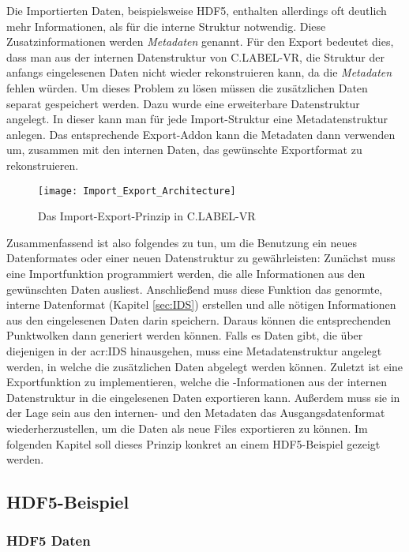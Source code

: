 Die Importierten Daten, beispielsweise HDF5, enthalten allerdings oft deutlich mehr Informationen, als für die interne Struktur notwendig. Diese Zusatzinformationen werden \textit{Metadaten} genannt. Für den Export bedeutet dies, dass man aus der internen Datenstruktur von C.LABEL-VR, die Struktur der anfangs eingelesenen Daten nicht wieder rekonstruieren kann, da die \textit{Metadaten} fehlen würden. Um dieses Problem zu lösen müssen die zusätzlichen Daten separat gespeichert werden. Dazu wurde eine erweiterbare Datenstruktur angelegt. In dieser kann man für jede Import-Struktur eine Metadatenstruktur anlegen. Das entsprechende Export-Addon kann die Metadaten dann verwenden um, zusammen mit den internen Daten, das gewünschte Exportformat zu rekonstruieren. \\

\begin{figure}%
	\centering
    \texttt{[image: Import\_Export\_Architecture]}
    \caption{Das Import-Export-Prinzip in C.LABEL-VR}
    \label{fig:ImportExport}
\end{figure}

Zusammenfassend ist also folgendes zu tun, um die Benutzung ein neues Datenformates oder einer neuen Datenstruktur zu gewährleisten: Zunächst muss eine Importfunktion programmiert werden, die alle Informationen aus den gewünschten Daten ausliest. Anschließend muss diese Funktion das genormte, interne Datenformat (Kapitel \ref{sec:IDS}) erstellen und alle nötigen Informationen aus den eingelesenen Daten darin speichern.  Daraus können die entsprechenden Punktwolken dann generiert werden können. Falls es Daten gibt, die über diejenigen in der \acrshort{acr:IDS} hinausgehen, muss eine Metadatenstruktur angelegt werden, in welche die zusätzlichen Daten abgelegt werden können. Zuletzt ist eine Exportfunktion zu implementieren, welche die -Informationen aus der internen Datenstruktur in die eingelesenen Daten exportieren kann. Außerdem muss sie in der Lage sein aus den internen- und den Metadaten das Ausgangsdatenformat wiederherzustellen, um die Daten als neue Files exportieren zu können. Im folgenden Kapitel soll dieses Prinzip konkret an einem HDF5-Beispiel gezeigt werden.

\subsection{HDF5-Beispiel}
\subsubsection{HDF5 Daten}
\label{sec:HDF5}
